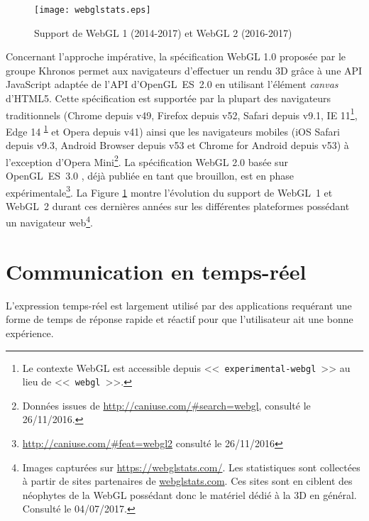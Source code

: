 
\begin{figure}[hbt]
	\centering
	\texttt{[image: webglstats.eps]}
	\caption{Support de WebGL 1 (2014-2017) et WebGL 2 
		(2016-2017)}
	\label{fig:webglstats}
\end{figure}

Concernant l'approche impérative, la spécification WebGL 1.0 \cite{Khronos2011} 
proposée par le groupe Khronos permet aux navigateurs d'effectuer un rendu 3D 
grâce à une \gls{API} JavaScript adaptée de l'\gls{API} d'OpenGL~ES~2.0 
\cite{Khronos2007} en utilisant l'élément \textit{canvas} d'\gls{HTML}5. Cette 
spécification est supportée par la plupart des navigateurs traditionnels (Chrome 
depuis v49, Firefox depuis v52, Safari depuis v9.1, IE 11\footnote{Le contexte 
	WebGL est accessible depuis <<~\texttt{experimental-webgl}~>> au lieu de 
	<<~\texttt{webgl}~>>.\label{fn:webglcontext}}, Edge 14\textsuperscript{ 
	\ref{fn:webglcontext}} et Opera depuis v41) ainsi que les navigateurs mobiles 
	(iOS 
Safari depuis v9.3, Android Browser depuis v53 et Chrome for Android depuis v53) 
à l'exception d'Opera Mini\footnote{Données issues de 
	\url{http://caniuse.com/\#search=webgl}, consulté le 26/11/2016.}. La 
	spécification 
WebGL 2.0 \cite{Khronos2016} basée sur OpenGL~ES~3.0 \cite{Khronos2008}, 
déjà publiée en tant que brouillon, est en phase 
expérimentale\footnote{\url{http://caniuse.com/\#feat=webgl2} consulté le 
	26/11/2016}. La Figure 
\ref{fig:webglstats} montre l'évolution du support de WebGL~1 et WebGL~2 durant 
ces dernières années sur les différentes plateformes possédant un navigateur 
web\footnote{Images capturées sur \url{https://webglstats.com/}. Les statistiques 
	sont collectées à partir de sites partenaires de \url{webglstats.com}. Ces sites 
	sont en 
	ciblent des néophytes de la WebGL possédant donc le matériel 
	dédié à la 3D en général. Consulté le 04/07/2017.}.

\section{Communication en temps-réel}
L'expression temps-réel est largement utilisé par des applications requérant une 
forme de temps de réponse rapide et réactif pour que l'utilisateur ait une bonne 
expérience.

